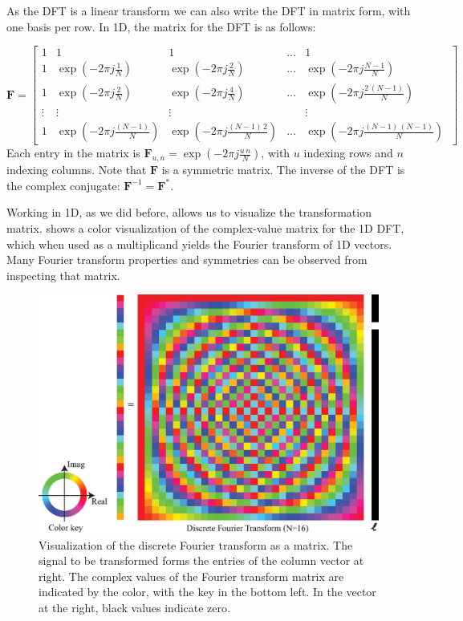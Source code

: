 As the DFT is a linear transform we can also write the DFT in matrix form, with one basis per row. In 1D, the matrix for the DFT is as follows:

\begin{equation}
    \mathbf{F} = \begin{bmatrix}
1 & 1 & 1 & \dots & 1\\ %
1 & \exp{ \left(-2\pi j \frac{1}{N} \right)} & \exp{ \left(-2\pi j \frac{2}{N} \right)} & \dots & \exp{ \left(-2\pi j \frac{N-1}{N} \right)}\\ %
1 & \exp{ \left(-2\pi j \frac{2}{N} \right)} & \exp{ \left(-2\pi j \frac{4}{N} \right)} & \dots & \exp{ \left(-2\pi j \frac{2\, (N-1)}{N} \right)}\\ %
\vdots & \vdots & \vdots & ~ & \vdots \\
1 & \exp{ \left(-2\pi j \frac{(N-1)}{N} \right)} & \exp{ \left(-2\pi j \frac{(N-1)\, 2}{N} \right)} & \dots & \exp{ \left(-2\pi j \frac{(N-1)\, (N-1)}{N} \right)}\
\end{bmatrix}
\end{equation}
Each entry in the matrix is $\mathbf{F}_{u,n} = \exp{ \left(-2\pi j \frac{u\, n}{N} \right)}$, with $u$ indexing rows and $n$ indexing columns. Note that $\mathbf{F}$ is a symmetric matrix. The inverse of the DFT is the complex conjugate: $\mathbf{F}^{-1} = \mathbf{F}^{*}$.

Working in 1D, as we did before, allows us to visualize the transformation matrix. \Fig{\ref{fig:colorDFT}} shows a color visualization of the
complex-value matrix for the 1D DFT, which when used as a multiplicand yields the Fourier transform of 1D vectors.  Many Fourier transform properties and symmetries can be observed from inspecting that matrix. %


\begin{figure}[t]
\centerline{
\includegraphics[width=0.7\linewidth]{figures/Image_processing_fourier/visualization_DFT_color.eps}}
\caption{Visualization of the discrete Fourier transform as a matrix.  The signal to be
 transformed forms the entries of the column vector at right.  The
 complex values of the Fourier transform matrix are indicated by the color,
 with the key in the bottom left.  In the vector at the right, black
 values indicate zero.
} 
\label{fig:colorDFT}
\end{figure}

